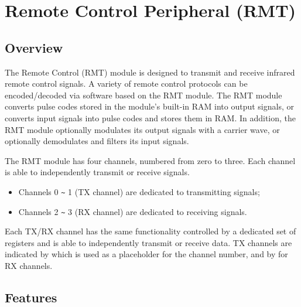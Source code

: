 \documentclass[main\_\_EN.tex]{subfiles}
\begin{document}

\ifglobal
\else
    \listoftodos
    {\let\clearpage\relax \listofdonetodos}
    \tableofcontents
\fi



\hypertarget{rmt}{}
\chapter{Remote Control Peripheral (RMT)}
\label{mod:rmt}

\section{Overview}

The Remote Control (RMT) module is designed to transmit and receive infrared remote control signals. A variety of remote control protocols can be encoded/decoded via software based on the RMT module. The RMT module converts pulse codes stored in the module's built-in RAM into output signals, or converts input signals into pulse codes and stores them in RAM. In addition, the RMT module optionally modulates its output signals with a carrier wave, or optionally demodulates and filters its input signals.

The RMT module has four channels, numbered from zero to three. Each channel is able to independently transmit or receive signals.
\begin{itemize}
    \item Channels 0 \verb+~+ 1 (TX channel) are dedicated to transmitting signals;
    \item Channels 2 \verb+~+ 3 (RX channel) are dedicated to receiving signals.
\end{itemize}

Each TX/RX channel has the same functionality controlled by a dedicated set of registers and is able to independently transmit or receive data. TX channels are indicated by  which is used as a placeholder for the channel number, and by  for RX channels.

\section{Features}
\end{document}
